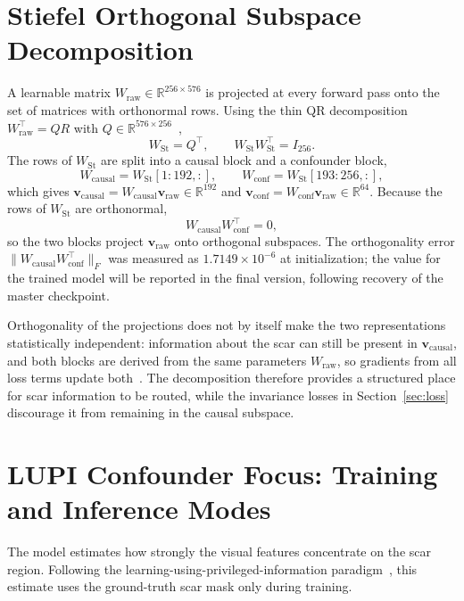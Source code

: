 \section{Stiefel Orthogonal Subspace Decomposition}
A learnable matrix $W_{\text{raw}} \in \mathbb{R}^{256 \times 576}$ is projected at every forward pass onto the set of matrices with orthonormal rows. Using the thin QR decomposition $W_{\text{raw}}^{\top} = QR$ with $Q \in \mathbb{R}^{576 \times 256}$~\cite{edelman1998},
\begin{equation}
W_{\text{St}} = Q^{\top}, \qquad W_{\text{St}} W_{\text{St}}^{\top} = I_{256}.
\end{equation}
The rows of $W_{\text{St}}$ are split into a causal block and a confounder block,
\begin{equation}
W_{\text{causal}} = W_{\text{St}}[1{:}192, :], \qquad W_{\text{conf}} = W_{\text{St}}[193{:}256, :],
\end{equation}
which gives $\mathbf{v}_{\text{causal}} = W_{\text{causal}}\mathbf{v}_{\text{raw}} \in \mathbb{R}^{192}$ and $\mathbf{v}_{\text{conf}} = W_{\text{conf}}\mathbf{v}_{\text{raw}} \in \mathbb{R}^{64}$. Because the rows of $W_{\text{St}}$ are orthonormal,
\begin{equation}
W_{\text{causal}} W_{\text{conf}}^{\top} = 0,
\end{equation}
so the two blocks project $\mathbf{v}_{\text{raw}}$ onto orthogonal subspaces. The orthogonality error $\|W_{\text{causal}} W_{\text{conf}}^{\top}\|_F$ was measured as $1.7149 \times 10^{-6}$ at initialization; the value for the trained model will be reported in the final version, following recovery of the master checkpoint.

Orthogonality of the projections does not by itself make the two representations statistically independent: information about the scar can still be present in $\mathbf{v}_{\text{causal}}$, and both blocks are derived from the same parameters $W_{\text{raw}}$, so gradients from all loss terms update both~\cite{sarhan2020, huang2018}. The decomposition therefore provides a structured place for scar information to be routed, while the invariance losses in Section~\ref{sec:loss} discourage it from remaining in the causal subspace.

\section{LUPI Confounder Focus: Training and Inference Modes}
The model estimates how strongly the visual features concentrate on the scar region. Following the learning-using-privileged-information paradigm~\cite{vapnik2009, vapnik2015}, this estimate uses the ground-truth scar mask only during training.

